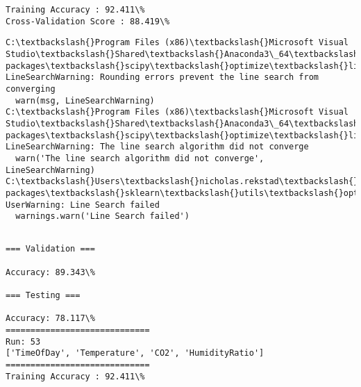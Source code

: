 \documentclass[11pt]{article}
\begin{document}
    \begin{Verbatim}[commandchars=\\\{\}]
Training Accuracy : 92.411\%
Cross-Validation Score : 88.419\%

    \end{Verbatim}

    \begin{Verbatim}[commandchars=\\\{\}]
C:\textbackslash{}Program Files (x86)\textbackslash{}Microsoft Visual Studio\textbackslash{}Shared\textbackslash{}Anaconda3\_64\textbackslash{}lib\textbackslash{}site-packages\textbackslash{}scipy\textbackslash{}optimize\textbackslash{}linesearch.py:422: LineSearchWarning: Rounding errors prevent the line search from converging
  warn(msg, LineSearchWarning)
C:\textbackslash{}Program Files (x86)\textbackslash{}Microsoft Visual Studio\textbackslash{}Shared\textbackslash{}Anaconda3\_64\textbackslash{}lib\textbackslash{}site-packages\textbackslash{}scipy\textbackslash{}optimize\textbackslash{}linesearch.py:313: LineSearchWarning: The line search algorithm did not converge
  warn('The line search algorithm did not converge', LineSearchWarning)
C:\textbackslash{}Users\textbackslash{}nicholas.rekstad\textbackslash{}AppData\textbackslash{}Roaming\textbackslash{}Python\textbackslash{}Python36\textbackslash{}site-packages\textbackslash{}sklearn\textbackslash{}utils\textbackslash{}optimize.py:195: UserWarning: Line Search failed
  warnings.warn('Line Search failed')

    \end{Verbatim}

    \begin{Verbatim}[commandchars=\\\{\}]

=== Validation ===

Accuracy: 89.343\%

=== Testing ===

Accuracy: 78.117\%
=============================
Run: 53
['TimeOfDay', 'Temperature', 'CO2', 'HumidityRatio']
=============================
Training Accuracy : 92.411\%

    \end{Verbatim}
\end{document}
